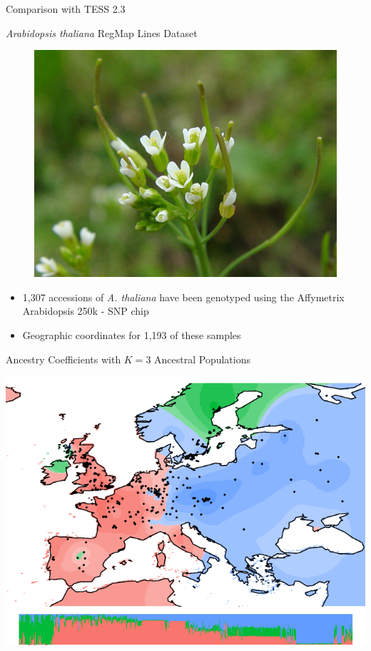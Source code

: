 \documentclass{beamer}\usepackage[]{graphicx}\usepackage[]{color}
\begin{document}
\begin{frame}{Comparison with TESS 2.3 }
\end{frame}

\begin{frame}{\emph{Arabidopsis thaliana} RegMap Lines Dataset}

\begin{figure}[H]
   \includegraphics[width=0.45\linewidth]{a_thaliana.jpg}
  \label{fig:ma_fig}

\end{figure}

\begin{itemize}
  \item 1,307 accessions of \emph{A. thaliana} have been genotyped using the Affymetrix Arabidopsis 250k - SNP chip~\citep{horton2012genome}
  \item Geographic coordinates for 1,193 of these samples~\citep{anastasio2011source}
\end{itemize}

\end{frame}


\begin{frame}{Ancestry Coefficients with $K = 3$ Ancestral Populations}
\begin{center}
\includegraphics[width=0.9\linewidth]{Q_K3.pdf}
\end{center}
\end{frame}
\end{document}
